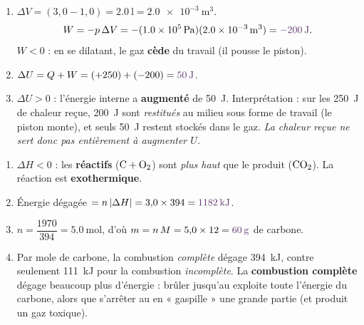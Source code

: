 \documentclass[11pt,a4paper]{article}
\newcommand{\dH}{\Delta H}
\newcommand{\dU}{\Delta U}
\newcommand{\rep}[1]{\textcolor{primarydark}{\textbf{#1}}}
\begin{document}
\begin{center}
\end{center}

\begin{correction}
\begin{enumerate}[label=\alph*),leftmargin=2em,topsep=2pt,itemsep=3pt]
  \item $\Delta V = (3{,}0-1{,}0)=\SI{2.0}{\litre}=\SI{2.0e-3}{\cubic\metre}$.
        \[ W = -p\,\Delta V = -(\SI{1.0e5}{\pascal})(\SI{2.0e-3}{\cubic\metre}) = \rep{\SI{-200}{\joule}}. \]
        $W<0$ : en se dilatant, le gaz \rep{cède} du travail (il pousse le piston).
  \item $\dU = Q + W = (+250) + (-200) = \rep{\SI{+50}{\joule}}$.
  \item $\dU>0$ : l'énergie interne a \rep{augmenté} de \SI{50}{\joule}. Interprétation : sur les
        \SI{250}{\joule} de chaleur reçue, \SI{200}{\joule} sont \emph{restitués} au milieu sous forme de
        travail (le piston monte), et seuls \SI{50}{\joule} restent stockés dans le gaz. \emph{La chaleur
        reçue ne sert donc pas entièrement à augmenter $U$.}
\end{enumerate}
\end{correction}

\begin{correction}
\begin{enumerate}[label=\alph*),leftmargin=2em,topsep=2pt,itemsep=2pt]
  \item $\dH<0$ : les \rep{réactifs} ($\ce{C}+\ce{O2}$) sont \emph{plus haut} que le produit ($\ce{CO2}$).
        La réaction est \rep{exothermique}.
  \item Énergie dégagée $= n\,|\dH| = 3{,}0 \times 394 = \rep{\SI{1182}{\kilo\joule}}$.
  \item $n = \dfrac{1970}{394} = \SI{5.0}{\mol}$, \; d'où $m = n\,M = 5{,}0 \times 12 = \rep{\SI{60}{\gram}}$
        de carbone.
  \item Par mole de carbone, la combustion \emph{complète} dégage \SI{394}{\kilo\joule}, contre seulement
        \SI{111}{\kilo\joule} pour la combustion \emph{incomplète}. La \rep{combustion complète} dégage
        beaucoup plus d'énergie : brûler jusqu'au  exploite toute l'énergie du carbone, alors que
        s'arrêter au  en « gaspille » une grande partie (et produit un gaz toxique).
\end{enumerate}
\end{correction}
\end{document}
